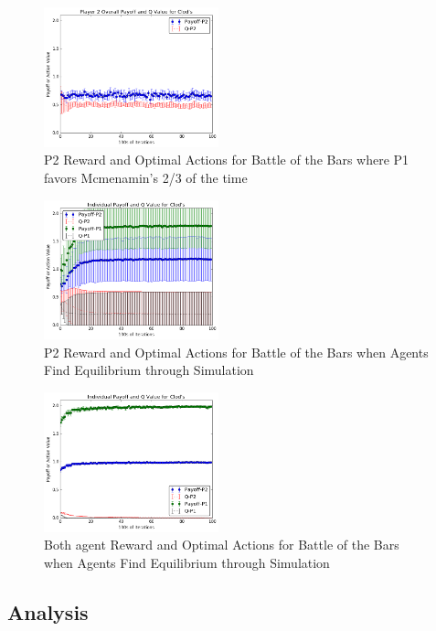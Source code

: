 \documentclass[letterpaper, 10 pt, conference]{ieeeconf}  %
\begin{document}
\begin{figure}[ht]
\centering
\includegraphics[width=0.45\textwidth]{Scenario3}
\caption{P2 Reward and Optimal Actions for Battle of the Bars where P1 favors Mcmenamin's 2/3 of the time}
\label{scenario3}
\end{figure}
\begin{figure}[ht]
\centering
\includegraphics[width=0.45\textwidth]{Scenario4}
\caption{P2 Reward and Optimal Actions for Battle of the Bars when Agents Find Equilibrium through Simulation}
\label{scenario4}
\end{figure}

\begin{figure}[ht]
\centering
\includegraphics[width=0.45\textwidth]{Scenario4_seeded}
\caption{Both agent Reward and Optimal Actions for Battle of the Bars when Agents Find Equilibrium through Simulation}
\label{scenario4_seeded}
\end{figure}

\subsection{Analysis}
\end{document}
